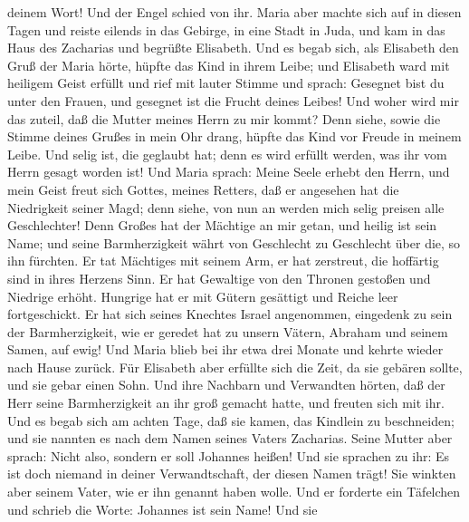 deinem Wort! Und der Engel schied von ihr.  Maria aber
machte sich auf in diesen Tagen und reiste eilends in das Gebirge, in
eine Stadt in Juda,  und kam in das Haus des Zacharias
und begrüßte Elisabeth.  Und es begab sich, als Elisabeth
den Gruß der Maria hörte, hüpfte das Kind in ihrem Leibe; und Elisabeth
ward mit heiligem Geist erfüllt  und rief mit lauter
Stimme und sprach: Gesegnet bist du unter den Frauen, und gesegnet ist
die Frucht deines Leibes!  Und woher wird mir das zuteil,
daß die Mutter meines Herrn zu mir kommt?  Denn siehe,
sowie die Stimme deines Grußes in mein Ohr drang, hüpfte das Kind vor
Freude in meinem Leibe.  Und selig ist, die geglaubt hat;
denn es wird erfüllt werden, was ihr vom Herrn gesagt worden ist!
 Und Maria sprach: Meine Seele erhebt den Herrn,
 und mein Geist freut sich Gottes, meines Retters,
 daß er angesehen hat die Niedrigkeit seiner Magd; denn
siehe, von nun an werden mich selig preisen alle Geschlechter!
 Denn Großes hat der Mächtige an mir getan, und heilig
ist sein Name;  und seine Barmherzigkeit währt von
Geschlecht zu Geschlecht über die, so ihn fürchten.  Er
tat Mächtiges mit seinem Arm, er hat zerstreut, die hoffärtig sind in
ihres Herzens Sinn.  Er hat Gewaltige von den Thronen
gestoßen und Niedrige erhöht.  Hungrige hat er mit Gütern
gesättigt und Reiche leer fortgeschickt.  Er hat sich
seines Knechtes Israel angenommen, eingedenk zu sein der Barmherzigkeit,
 wie er geredet hat zu unsern Vätern, Abraham und seinem
Samen, auf ewig!  Und Maria blieb bei ihr etwa drei
Monate und kehrte wieder nach Hause zurück.  Für
Elisabeth aber erfüllte sich die Zeit, da sie gebären sollte, und sie
gebar einen Sohn.  Und ihre Nachbarn und Verwandten
hörten, daß der Herr seine Barmherzigkeit an ihr groß gemacht hatte, und
freuten sich mit ihr.  Und es begab sich am achten Tage,
daß sie kamen, das Kindlein zu beschneiden; und sie nannten es nach dem
Namen seines Vaters Zacharias.  Seine Mutter aber sprach:
Nicht also, sondern er soll Johannes heißen!  Und sie
sprachen zu ihr: Es ist doch niemand in deiner Verwandtschaft, der
diesen Namen trägt!  Sie winkten aber seinem Vater, wie
er ihn genannt haben wolle.  Und er forderte ein
Täfelchen und schrieb die Worte: Johannes ist sein Name! Und sie

